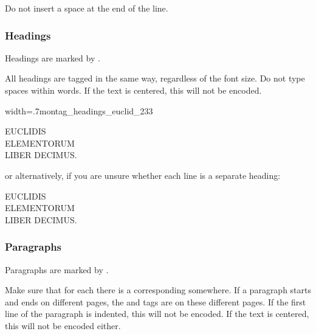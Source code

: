 \begin{clarification}
Do not insert a space at the end of the line.
\end{clarification}

\subsubsection{Headings}
\label{section headings}

\begin{mainrule}
Headings are marked by .
\end{mainrule}

\begin{clarification}
All headings are tagged in the same way, regardless of the font size. Do not type spaces within words. If the text is centered, this will not be encoded.
\end{clarification}

\begin{sampleImageSmall}{width=.7\linewidth}{montag_headings_euclid_233}
\begin{typeLatin}
EUCLIDIS \\
ELEMENTORUM \\
LIBER DECIMUS.
\end{typeLatin}
or alternatively, if you are unsure whether each line is a separate heading:
\begin{typeLatin}
EUCLIDIS \\
ELEMENTORUM \\
LIBER DECIMUS.
\end{typeLatin}
\end{sampleImageSmall}


\subsubsection{Paragraphs}
\label{section paragraphs}

\begin{mainrule}
Paragraphs are marked by .
\end{mainrule}

\begin{clarification}
Make sure that for each  there is a corresponding  somewhere. If a paragraph starts and ends on different pages, the  and  tags are on these different pages.
If the first line of the paragraph is indented, this will not be encoded. If the text is centered, this will not be encoded either.
\end{clarification}

